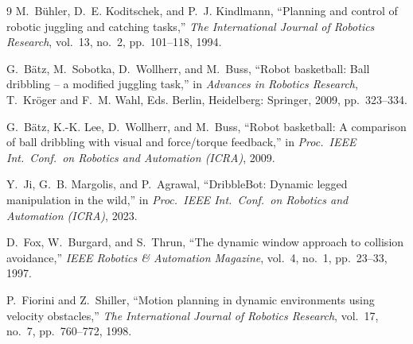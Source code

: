 \documentclass[10pt,twocolumn]{article}
\begin{document}
\begin{thebibliography}{9}
 M.~Bühler, D.~E. Koditschek, and P.~J. Kindlmann,
``Planning and control of robotic juggling and catching tasks,''
\emph{The International Journal of Robotics Research}, vol.~13, no.~2,
pp.~101--118, 1994.

 G.~Bätz, M.~Sobotka, D.~Wollherr, and M.~Buss, ``Robot
basketball: Ball dribbling -- a modified juggling task,'' in \emph{Advances
in Robotics Research}, T.~Kröger and F.~M. Wahl, Eds. Berlin, Heidelberg:
Springer, 2009, pp.~323--334.

 G.~Bätz, K.-K. Lee, D.~Wollherr, and M.~Buss, ``Robot
basketball: A comparison of ball dribbling with visual and force/torque
feedback,'' in \emph{Proc.\ IEEE Int.\ Conf.\ on Robotics and Automation
(ICRA)}, 2009.

 Y.~Ji, G.~B. Margolis, and P.~Agrawal, ``DribbleBot:
Dynamic legged manipulation in the wild,'' in \emph{Proc.\ IEEE Int.\ Conf.\
on Robotics and Automation (ICRA)}, 2023.

 D.~Fox, W.~Burgard, and S.~Thrun, ``The dynamic window
approach to collision avoidance,'' \emph{IEEE Robotics \& Automation
Magazine}, vol.~4, no.~1, pp.~23--33, 1997.

 P.~Fiorini and Z.~Shiller, ``Motion planning in
dynamic environments using velocity obstacles,'' \emph{The International
Journal of Robotics Research}, vol.~17, no.~7, pp.~760--772, 1998.
\end{thebibliography}
\end{document}
